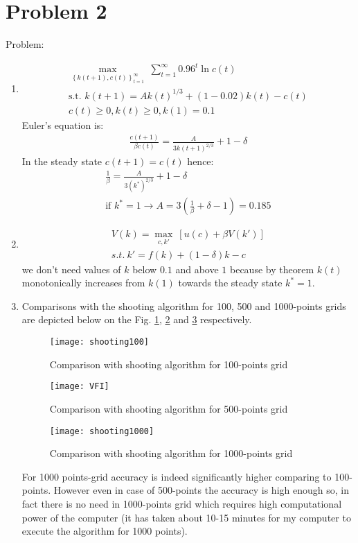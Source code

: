 \documentclass[a4paper]{article}
\begin{document}
\section*{Problem 2}
Problem:
\begin{enumerate}[1.]
	\item
\begin{align*}
\underset{\left\{k(t+1), c(t)\right\}_{t=1}^{\infty}}{\max}\ \sum_{t=1}^{\infty} 0.96^t \ln c(t)\\
\text{s.t.\ } k(t+1) = Ak(t)^{1/3} + (1-0.02)k(t) - c(t)\\
c(t) \ge 0, k(t) \ge 0, k(1) = 0.1
\end{align*}
Euler's equation is:
\begin{align*}
\frac{c(t+1)}{\beta c(t)} = \frac{A}{3k(t+1)^{2/3}} + 1 - \delta
\end{align*}
In the steady state $c(t+1) = c(t)$ hence:
\begin{align*}
\frac{1}{\beta} = \frac{A}{3(k^*)^{2/3}} + 1 - \delta\\
\text{if } k^* = 1 \to A = 3(\frac{1}{\beta} + \delta - 1) = 0.185
\end{align*}
\item 
\begin{align*}
V(k) = \underset{c, k'}{\max}\ [u(c) + \beta V(k')]\\
s.t.\ k' = f(k) + (1 - \delta)k - c
\end{align*}
we don’t need values of $k$ below $0.1$ and
above $1$ because by theorem $k(t)$ monotonically increases from $k(1)$ towards the steady state $k^* = 1$.
\item Comparisons with the shooting algorithm for 100, 500 and 1000-points grids are depicted below on the Fig. \ref{fig4}, \ref{fig2} and \ref{fig5} respectively.
	\begin{figure}[h]
	\centering
	\texttt{[image: shooting100]}
	\caption{Comparison with shooting algorithm for 100-points grid}\label{fig4}
\end{figure}
	\begin{figure}[h]
	\centering
	\texttt{[image: VFI]}
	\caption{Comparison with shooting algorithm for 500-points grid}\label{fig2}
\end{figure}
	\begin{figure}[h]
	\centering
	\texttt{[image: shooting1000]}
	\caption{Comparison with shooting algorithm for 1000-points grid}\label{fig5}
\end{figure}



For 1000 points-grid accuracy is indeed significantly higher comparing to 100-points. However even in case of 500-points the accuracy is high enough so, in fact there is no need in 1000-points grid which requires high computational power of the computer (it has taken about 10-15 minutes for my computer to execute the algorithm for 1000 points).
\end{enumerate}
\end{document}
